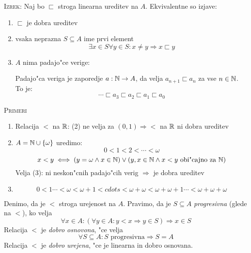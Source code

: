 \textsc{Izrek:} Naj bo $\sqsubset$ stroga linearna ureditev na $A$. Ekvivalentne so izjave:
\begin{enumerate}
	\item $\sqsubset$ je dobra ureditev\item vsaka neprazna $S \subseteq A$ ime prvi element
	\begin{equation*}
	\exists x \in S \forall y \in S: x \neq y \Rightarrow x \sqsubset y
	\end{equation*}
	\item $A$ nima padajo"ce verige:
	
	Padajo"ca veriga je zaporedje $a: \mathbb{N} \to A$, da velja $a_{n+1} \sqsubset a_n$ za vse $n \in \mathbb{N}$. To je:
	\begin{equation*}
	\cdots \sqsubset a_3 \sqsubset a_2 \sqsubset a_1 \sqsubset a_0
	\end{equation*}
\end{enumerate}
\textsc{Primeri}
\begin{enumerate}
	\item Relacija $<$ na $\mathbb{R}$: (2) ne velja za $(0, 1) \Rightarrow <$ na $\mathbb{R}$ ni dobra ureditev
	
	\item $A = \mathbb{N} \cup \{\omega\}$ uredimo:
	\begin{equation*}
	0 < 1 < 2 < \cdots < \omega
	\end{equation*}
	\begin{equation*}
	x < y \iff (y = \omega \land x \in \mathbb{N}) \lor (y, x \in \mathbb{N} \land x < y \text{ obi"cajno za $\mathbb{N}$})
	\end{equation*}
	Velja (3): ni neskon"cnih padajo"cih verig $\Rightarrow$ je dobra ureditev
	
	\item 
	\begin{equation*}
	0 < 1 \cdots < \omega < \omega + 1 < cdots < \omega + \omega < \omega + \omega + 1 \cdots < \omega + \omega + \omega
	\end{equation*}
\end{enumerate}
%
Denimo, da je $<$ stroga urejenost na $A$. Pravimo, da je $S \subseteq A$ \emph{progresivna} (glede na $<$), ko velja
\begin{equation*}
\forall x \in A: (\forall y \in A: y < x \Rightarrow y \in S) \Rightarrow x \in S
\end{equation*}
Relacija $<$ je \emph{dobro osnovona}, "ce velja
\begin{equation*}
\forall S \subseteq A: \text{$S$ progresivna} \Rightarrow S = A
\end{equation*}
Relacija $<$ je \emph{dobro urejena}, "ce je linearna in dobro osnovana.

